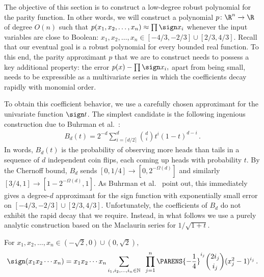 The objective of this section is to construct
a low-degree robust polynomial
for the parity function. In 
other words, we will construct a polynomial
$p\colon\R^n\to\R$ of degree $O(n)$ such that
$p(x_1,x_2,\dots,x_n) \approx \prod \sign x_i$ whenever the
input variables are close to Boolean:
$x_1,x_2,\dots,x_n\in[-4/3,-2/3]\cup[2/3,4/3]$. 
Recall that our eventual goal is a robust polynomial
for every bounded real function. To this end, the parity
approximant $p$ that we are to construct needs to 
possess a key additional
property: the error \mbox{$p(x)-\prod\sign x_i,$} apart from
being small, needs to be expressible as a
multivariate series in which the coefficients decay
rapidly with monomial order. 

To obtain this coefficient behavior, we use a carefully
chosen approximant for the univariate function
$\sign t$. The simplest candidate is 
the following ingenious construction due to 
Buhrman et al.~\cite{robust}:
\begin{align*}
B_d(t) = 2^{-d} \sum_{i=\lceil d/2\rceil}^d {d\choose i}
t^i(1-t)^{d-i}\,.
\end{align*}
In words, $B_d(t)$ is the probability of observing
more heads than tails in a sequence of $d$ independent
coin flips, each coming up heads with probability $t$.
By the Chernoff bound, $B_d$ sends
$[0,1/4]\to[0,2^{-\Omega(d)}]$ and similarly
$[3/4,1]\to[1-2^{-\Omega(d)},1]$. As Buhrman et
al.~\cite{robust} point out, this immediately gives a
degree-$d$ approximant for the sign function with
exponentially small error on
$[-4/3,-2/3]\cup[2/3,4/3]$. Unfortunately, the
coefficients of $B_d$ do not
exhibit the rapid decay that we require.
Instead, in what follows
we use a purely analytic construction based on the
Maclaurin series for $1/\sqrt{1+t}$. 

\begin{lemma}
\label{lem:parity-robust}
For $x_1,x_2,\dots,x_n\in(-\sqrt 2,0)\cup(0,\sqrt 2),$
\begin{align}
\label{eqn:parity-maclaurin}
\sign (x_1x_2\cdots x_n) =
x_1x_2\cdots x_n \sum_{i_1,i_2,\dots,i_n\in\mathbb N} 
\;\; \prod_{j=1}^n \PARENS{-\frac14}^{i_j}{2i_j \choose i_j}
(x_j^2-1)^{i_j}\,.
\end{align}
\end{lemma}


